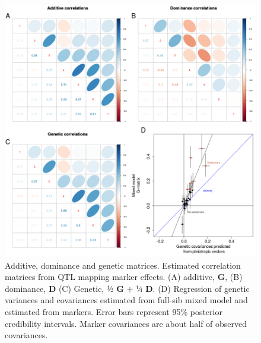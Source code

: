 \begin{refsection}
\begin{figure}
\includegraphics[width=\linewidth]{chapter_JoH-Melo_etal/media/growth_cov_prediction_composite.png}
\caption[Additive, dominance and genetic matrices]{Additive, dominance and genetic matrices. Estimated
correlation matrices from QTL mapping marker effects. (A) additive, \textbf{G}, (B)
dominance, \textbf{D} (C) Genetic, ½ \textbf{G} + ¼ \textbf{D}. (D) Regression of
genetic variances and covariances estimated from full-sib mixed model
and estimated from markers. Error bars represent 95\% posterior
credibility intervals. Marker covariances are about half of observed
covariances.}
\label{fig:joh:cov}
\end{figure}


\end{refsection}
